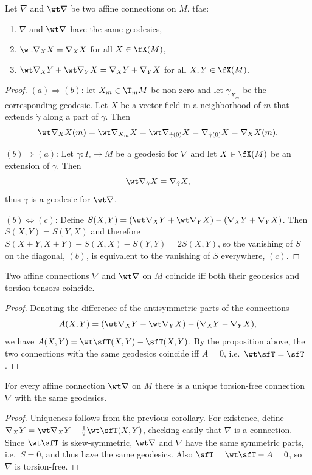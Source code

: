 \begin{prop}\label{prop geodesics coincide}
    Let $\nabla$ and $\wt\nabla$ be two affine connections on $M$. \gls{tfae}:
    \begin{enumerate}[label=(\alph*)]
        \item $\nabla$ and $\wt\nabla$ have the same geodesics,
        \item $\wt\nabla_X X=\nabla_X X$ for all $X\in\fX(M)$,
        \item $\wt\nabla_X Y+\wt\nabla_Y X=\nabla_X Y+\nabla_Y X$ for all $X,Y\in\fX(M)$.
    \end{enumerate}
\end{prop}
\begin{proof}
    $(a)\Rightarrow(b)$: let $X_m\in \T_mM$ be non-zero and let $\gamma_{X_m}$ be the corresponding geodesic. Let $X$ be a vector field in a neighborhood of $m$ that extends $\dot\gamma$ along a part of $\gamma$. Then 
    \[\wt\nabla_{X} X(m)=\wt\nabla_{X_m} X=\wt\nabla_{\dot\gamma(0)}X=\nabla_{\dot\gamma(0)}X=\nabla_X X(m).\]


    $(b)\Rightarrow(a)$: Let $\gamma:I_\epsilon\to M$ be a geodesic for $\nabla$ and let $X\in\fX(M)$ be an extension of $\dot\gamma$. Then 
    \[\wt\nabla_{\dot\gamma} X=\nabla_{\dot\gamma}X,\]
    thus $\gamma$ is a geodesic for $\wt\nabla$.

    $(b)\Leftrightarrow(c)$: Define $S(X,Y)=(\wt\nabla_X Y+\wt\nabla_Y X)-(\nabla_X Y+\nabla_Y X)$. Then $S(X,Y)=S(Y,X)$ and therefore $S(X+Y,X+Y)-S(X,X)-S(Y,Y)=2S(X,Y)$, so the vanishing of $S$ on the diagonal, $(b)$, is equivalent to the vanishing of $S$ everywhere, $(c)$.
\end{proof}
\begin{cor}
    Two affine connections $\nabla$ and $\wt\nabla$ on $M$ coincide iff both their geodesics and torsion tensors coincide.
\end{cor}
\begin{proof}
    Denoting the difference of the antisymmetric parts of the connections 
    \[A(X,Y)=(\wt\nabla_X Y-\wt\nabla_Y X)-(\nabla_X Y-\nabla_Y X),\]
    we have $A(X,Y)=\wt\sfT(X,Y)-\sfT(X,Y)$. By the proposition above, the two connections with the same geodesics coincide iff $A=0$, i.e.\ $\wt\sfT=\sfT$.
\end{proof}
\begin{cor}
    For every affine connection $\wt\nabla$ on $M$ there is a unique torsion-free connection $\nabla$ with the same geodesics.
\end{cor}
\begin{proof}
    Uniqueness follows from the previous corollary. For existence, define $\nabla_X Y=\wt\nabla_X Y-\frac12\wt\sfT(X,Y)$, checking easily that $\nabla$ is a connection. Since $\wt\sfT$ is skew-symmetric, $\wt\nabla$ and $\nabla$ have the same symmetric parts, i.e.\ $S=0$, and thus have the same geodesics. Also $\sfT=\wt \sfT-A=0$, so $\nabla$ is torsion-free.
\end{proof}


